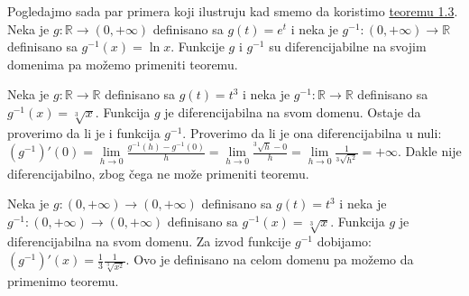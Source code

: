 \documentclass{article}
\begin{document}
Pogledajmo sada par primera koji ilustruju kad smemo da
koristimo \hyperref[teorema_1.3]{teoremu 1.3}.\\
Neka je $g: \mathbb{R} \longrightarrow (0, +\infty)$ definisano sa
$g(t) = e^t$ i neka je $g^{-1}:(0, +\infty)\longrightarrow \mathbb{R}$
definisano sa $g^{-1}(x) = \ln{x}$. Funkcije $g$ i $g^{-1}$
su diferencijabilne na svojim domenima pa možemo primeniti teoremu.\par
Neka je $g:\mathbb{R}\longrightarrow\mathbb{R}$
definisano sa $g(t) = t^3$ i neka je $g^{-1}:\mathbb{R}\longrightarrow\mathbb{R}$
definisano sa $g^{-1}(x) = \sqrt[3]{x}$. Funkcija $g$ je diferencijabilna
na svom domenu. Ostaje da proverimo da li je i funkcija $g^{-1}$. Proverimo da li je ona diferencijabilna u nuli:
$(g^{-1})'(0) = \lim\limits_{h\rightarrow 0}\frac{g^{-1}(h) - g^{-1}(0)}{h} = \lim\limits_{h\rightarrow 0}\frac{^3\sqrt{h} - 0}{h} = \lim\limits_{h\rightarrow 0}\frac{1}{^3\sqrt{h^2}} = +\infty$.
Dakle nije diferencijabilno, zbog čega ne može primeniti teoremu.\par
Neka je $g: (0, +\infty) \longrightarrow (0, +\infty)$
definisano sa $ g(t) = t^3$ i neka je $g^{-1}: (0,+\infty)\longrightarrow(0,+\infty)$
definisano sa $ g^{-1}(x) = \sqrt[3]{x}$. Funkcija $g$ je diferencijabilna na svom domenu.
Za izvod funkcije $g^{-1}$ dobijamo: $(g^{-1})'(x) = \frac{1}{3}\frac{1}{\sqrt[3]{x^2}}$.
Ovo je definisano na celom domenu pa možemo da primenimo teoremu.\par
\end{document}
